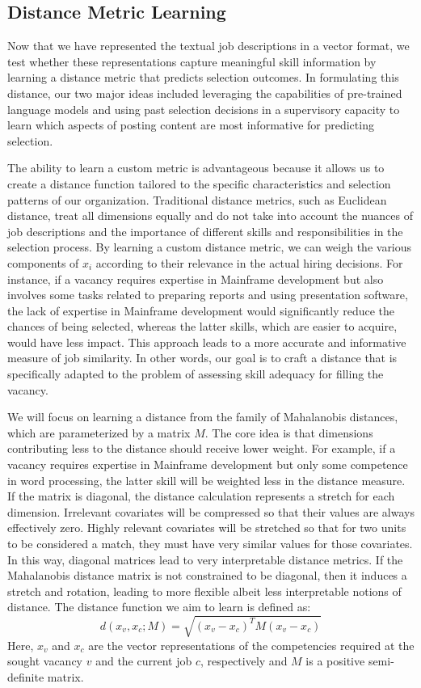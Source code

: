 \documentclass[12pt]{article}
\begin{document}
\subsection{Distance Metric Learning} 

Now that we have represented the textual job descriptions in a vector format, we test whether these representations capture meaningful skill information by learning a distance metric that predicts selection outcomes. In formulating this distance, our two major ideas included leveraging the capabilities of pre-trained language models and using past selection decisions in a supervisory capacity to learn which aspects of posting content are most informative for predicting selection.

The ability to learn a custom metric is advantageous because it allows us to create a distance function tailored to the specific characteristics and selection patterns of our organization. Traditional distance metrics, such as Euclidean distance, treat all dimensions equally and do not take into account the nuances of job descriptions and the importance of different skills and responsibilities in the selection process. By learning a custom distance metric, we can weigh the various components of \(x_i\) according to their relevance in the actual hiring decisions. For instance, if a vacancy requires expertise in Mainframe development but also involves some tasks related to preparing reports and using presentation software, the lack of expertise in Mainframe development would significantly reduce the chances of being selected, whereas the latter skills, which are easier to acquire, would have less impact. This approach leads to a more accurate and informative measure of job similarity. In other words, our goal is to craft a distance that is specifically adapted to the problem of assessing skill adequacy for filling the vacancy.

We will focus on learning a distance from the family of Mahalanobis distances, which are parameterized by a matrix \(M\). The core idea is that dimensions contributing less to the distance should receive lower weight. For example, if a vacancy requires expertise in Mainframe development but only some competence in word processing, the latter skill will be weighted less in the distance measure. If the matrix is diagonal, the distance calculation represents a stretch for each dimension. Irrelevant covariates will be compressed so that their values are always effectively zero. Highly relevant covariates will be stretched so that for two units to be considered a match, they must have very similar values for those covariates. In this way, diagonal matrices lead to very interpretable distance metrics. If the Mahalanobis distance matrix is not constrained to be diagonal, then it induces a stretch and rotation, leading to more flexible albeit less interpretable notions of distance. The distance function we aim to learn is defined as:
\begin{equation}
d(x_v, x_c; M) = \sqrt{(x_v - x_c)^T M (x_v - x_c)}
\end{equation}
Here, \(x_v\) and \(x_c\) are the vector representations of the competencies required at the sought vacancy \(v\) and the current job \(c\), respectively and $M$ is a positive semi-definite matrix.
\end{document}
